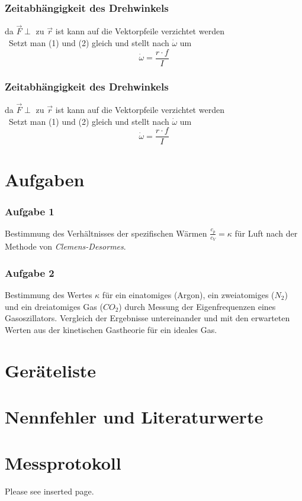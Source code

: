 \documentclass[%
   final,      %
   paper=a4, paper=portrait, pagesize=auto, %
   fontsize=11pt, %
   ngerman, %
 ]{scrartcl} %
\begin{document}
\subsubsection{Zeitabhängigkeit des Drehwinkels}
da $\vec{F} \perp$ zu $\vec{r}$ ist kann auf die Vektorpfeile verzichtet werden
\\\
Setzt man (1) und (2) gleich und stellt nach $\dot{\omega}$ um
\begin{equation}
\dot{\omega}=\frac{r\cdot f}{I}
\end{equation}
\subsubsection{Zeitabhängigkeit des Drehwinkels}
da $\vec{F} \perp$ zu $\vec{r}$ ist kann auf die Vektorpfeile verzichtet werden
\\\
Setzt man (1) und (2) gleich und stellt nach $\dot{\omega}$ um
\begin{equation}
\dot{\omega}=\frac{r\cdot f}{I}
\end{equation}
\section{Aufgaben}
\subsubsection{Aufgabe 1}
Bestimmung des Verhältnisses der spezifischen Wärmen $\frac{c_p}{c_V} = \kappa$ für Luft nach der Methode von \emph{Clemens-Desormes}.
\subsubsection{Aufgabe 2}
Bestimmung des Wertes $\kappa$ für ein einatomiges (Argon), ein zweiatomiges ($N_2$) und ein dreiatomiges Gas ($CO_2$) durch Messung der Eigenfrequenzen eines Gasoszillators.
Vergleich der Ergebnisse untereinander und mit den erwarteten Werten aus der kinetischen Gastheorie für ein ideales Gas.
\section{Geräteliste}
\section{Nennfehler und Literaturwerte}
\section{Messprotokoll}
Please see inserted page.
\end{document}
